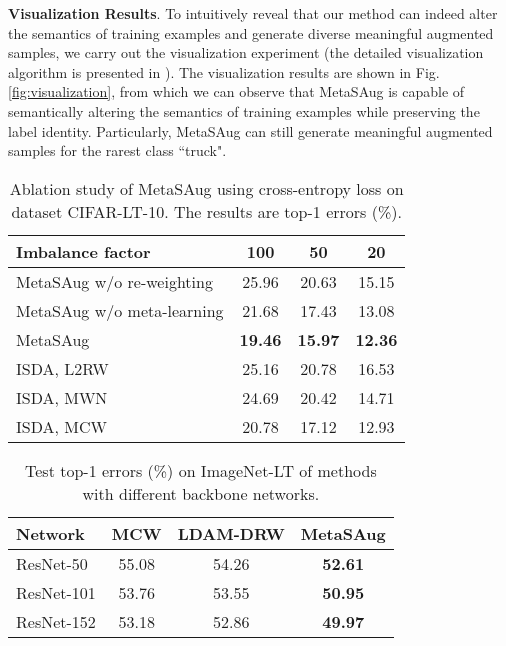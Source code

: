 \textbf{Visualization Results}. To intuitively reveal that our method can indeed alter the semantics of training examples and generate diverse meaningful augmented samples, we carry out the visualization experiment (the detailed visualization algorithm is presented in \cite{ISDA}). The visualization results are shown in Fig. \ref{fig:visualization}, from which we can observe that MetaSAug is capable of semantically altering the semantics of training examples while preserving the label identity. Particularly, MetaSAug can still generate meaningful augmented samples for the rarest class ``truck".


\begin{table}
	\centering
	\caption {Ablation study of MetaSAug using cross-entropy loss on dataset CIFAR-LT-10. The results are top-1 errors (\%).}
	{\begin{tabular}{l|c|c|c}
			\hline
			Imbalance factor  & 100 & 50 & 20 \\ \hline
			MetaSAug w/o re-weighting & 25.96 & 20.63 & 15.15 \\ \hline
			MetaSAug w/o meta-learning & 21.68 & 17.43 & 13.08 \\ \hline
			MetaSAug & \textbf{19.46} & \textbf{15.97} & \textbf{12.36} \\ \hline  \hline
			ISDA, L2RW \cite{L2RW} & 25.16 & 20.78 & 16.53  \\ \hline
			ISDA, MWN \cite{MetaWeightNet} & 24.69 & 20.42 & 14.71 \\ \hline
			ISDA, MCW \cite{jamal2020rethinking} & 20.78 & 17.12 & 12.93 \\ \hline
		\end{tabular}
	}\label{tab:ablation}
\end{table}



\begin{table}[htbp]
	\centering
	\small
	
	\caption {\small Test top-1 errors (\%) on ImageNet-LT of methods with different backbone networks.}
	
	{\begin{tabular}{l|c|c|c}
			\hline
			Network & MCW \cite{jamal2020rethinking} & LDAM-DRW \cite{cao2019learning} &  MetaSAug \\ \hline
			ResNet-50 & 55.08 & 54.26 & \textbf{52.61}  \\ \hline
			ResNet-101 & 53.76 & 53.55  & \textbf{50.95}  \\ \hline
			ResNet-152 & 53.18 &  52.86 & \textbf{49.97}  \\ \hline
		\end{tabular}
		
	}\vspace{-3mm}
	\label{tab:deeper_backbones} 
\end{table}




